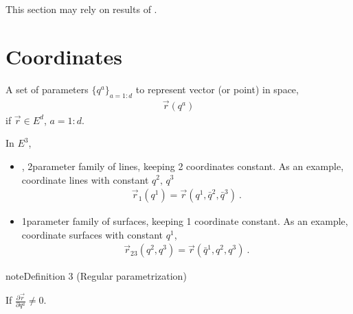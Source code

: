 \documentclass[letterpaper,10pt,english]{jupyterBook}
\begin{document}
\sphinxAtStartPar
This section may rely on results of {\hyperref[\detokenize{ch/differential-geometry/intro:differential-geometry-intro}]{}}.


\section{Coordinates}
\label{\detokenize{ch/tensor-algebra-calculus/calculus-euclidean:coordinates}}\label{\detokenize{ch/tensor-algebra-calculus/calculus-euclidean:tensor-calculus-coordinates}}
\sphinxAtStartPar
A set of parameters \(\{q^a\}_{a=1:d}\) to represent vector (or point) in space,
\begin{equation*}
\begin{split}\vec{r}(q^a)\end{split}
\end{equation*}
\sphinxAtStartPar
if \(\vec{r} \in E^{d}\), \(a=1:d\).

\sphinxAtStartPar
In \(E^3\),
\begin{itemize}
\item {} 
\sphinxAtStartPar
{}, 2\sphinxhyphen{}parameter family of lines, keeping 2 coordinates constant. As an example, coordinate lines with constant \(q^2, \, q^3\)
\begin{equation*}
\begin{split}\vec{r}_1(q^1) = \vec{r}(q^1, \bar{q}^2, \bar{q}^3) \ .\end{split}
\end{equation*}
\item {} 
\sphinxAtStartPar
{} 1\sphinxhyphen{}parameter family of surfaces, keeping 1 coordinate constant. As an example, coordinate surfaces with constant \(q^1\),
\begin{equation*}
\begin{split}\vec{r}_{23}(q^2, q^3) = \vec{r}(\bar{q}^1, q^2, q^3) \ .\end{split}
\end{equation*}
\end{itemize}
\label{ch/tensor-algebra-calculus/calculus-euclidean:definition-0}
\begin{sphinxadmonition}{note}{Definition 3 (Regular parametrization)}



\sphinxAtStartPar
If \(\frac{\partial \vec{r}}{\partial q^a} \ne 0\).
\end{sphinxadmonition}
\end{document}
